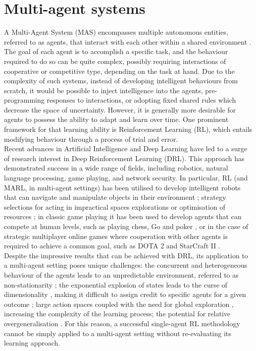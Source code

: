 \documentclass[a4paper,singleside,12pt]{report} %
\begin{document}
\section{Multi-agent systems}\label{multi-agent-systems}

A Multi-Agent System (MAS) encompasses multiple autonomous entities, referred to as agents, that interact with each other within a shared environment \cite{weiss1999multiagent}. The goal of each agent is to accomplish a specific task, and the behaviour required to do so can be quite complex, possibly requiring interactions of cooperative or competitive type, depending on the task at hand. Due to the complexity of such systems, instead of developing intelligent behaviours from scratch, it would be possible to inject intelligence into the agents, pre-programming responses to interactions, or adopting fixed shared rules which decrease the space of uncertainty. However, it is generally more desirable for agents to possess the ability to adapt and learn over time. One prominent framework for that learning ability is Reinforcement Learning (RL), which entails modifying behaviour through a process of trial and error.\\
Recent advances in Artificial Intelligence and Deep Learning have led to a surge of research interest in Deep Reinforcement Learning (DRL). This approach has demonstrated success in a wide range of fields, including robotics, natural language processing, game playing, and network security. In particular, RL (and MARL, in multi-agent settings) has been utilised to develop intelligent robots that can navigate and manipulate objects in their environment \cite{Albrecht2017AutonomousAM}; strategy selections for acting in impractical spaces explorations \cite{Silva2019ASO} or optimisation of resources \cite{Mnih2015HumanlevelCT}; in classic game playing it has been used to develop agents that can compete at human levels, such as playing chess, Go and poker \cite{Silver2016MasteringTG, Silver2017MasteringTG, Brown2018SuperhumanAF}, or in the case of strategic multiplayer online games where cooperation with other agents is required to achieve a common goal, such as DOTA 2 \cite{OpenAI_dota} and StarCraft II \cite{Vinyals2019GrandmasterLI}.\\
Despite the impressive results that can be achieved with DRL, its application to a multi-agent setting poses unique challenges: the concurrent and heterogeneous behaviour of the agents leads to an unpredictable environment, referred to as non-stationarity \cite{Shoham2007IfML, Buoniu2008ACS, HernandezLeal2017ASO}; the exponential explosion of states leads to the curse of dimensionality \cite{Shoham2007IfML, Buoniu2008ACS}, making it difficult to assign credit to specific agents for a given outcome \cite{Wolpert2001OptimalPF, Agogino2004UnifyingTA}; large action spaces coupled with the need for global exploration \cite{Matignon2012IndependentRL}, increasing the complexity of the learning process; the potential for relative overgeneralisation \cite{Fulda2007PredictingAP, Wei2016LenientLI, Palmer2017LenientMD}. For this reason, a successful single-agent RL methodology cannot be simply applied to a multi-agent setting without re-evaluating its learning approach.
\end{document}
